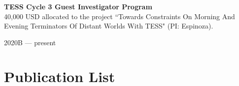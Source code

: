 \documentclass[12pt, a4paper]{article} %
\begin{document}
\begin{minipage}[t]{0.7\textwidth}
\begin{flushleft}%
  \setlength{\leftskip}{0.2cm}%
\textbf{TESS Cycle 3 Guest Investigator Program}\\
40,000 USD allocated to the project ``Towards Constraints On Morning And Evening Terminators Of Distant Worlds With TESS" (PI: Espinoza).
\end{flushleft}
\end{minipage}
\begin{minipage}[t]{0.3\textwidth}
\hfill 2020B --- present
\end{minipage}

\section*{Publication List}
\end{document}
